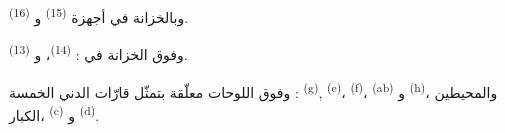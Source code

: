 وبالخزانة في أجهزة  \textsuperscript{(15)}
و \textsuperscript{(16)}.

وفوق الخزانة في :  \textsuperscript{(14)}،
 و \textsuperscript{(13)}.

وفوق اللوحات معلّقة  بتمثّل قارّات الدني الخمسة :
 \textsuperscript{(g)}, 
\textsuperscript{(e)}،  \textsuperscript{(f)}،
 \textsuperscript{(ab)} و
\textsuperscript{(h)}، والمحيطين الكبار، 
\textsuperscript{(c)} و \textsuperscript{(d)}.

\VUsaut{6.0mm}
\VUfilet{22mm}
